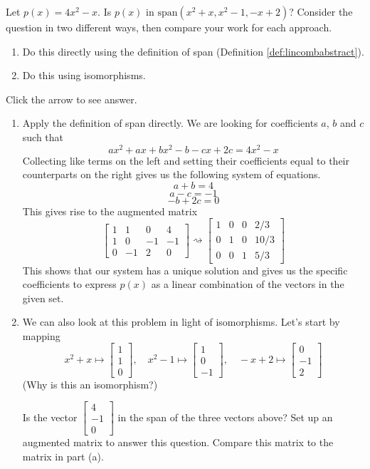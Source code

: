 \documentclass{ximera}
\begin{document}
\begin{problem}\label{prb:10.24} Let $p(x) = 4x^2-x$. Is $p(x)$ in
 $\mbox{span} \left( x^2+x, x^2-1, -x + 2 \right)$?  Consider the question in two different ways, then compare your work for each approach.
 \begin{enumerate}
     \item Do this directly using the definition of span (Definition \ref{def:lincombabstract}).
     \item Do this using isomorphisms.
 \end{enumerate}

Click the arrow to see answer.
\begin{expandable}
    \begin{enumerate}
        \item Apply the definition of span directly.  We are looking for coefficients $a$, $b$ and $c$ such that 
        $$ax^2+ax+bx^2-b-cx+2c=4x^2-x$$
        Collecting like terms on the left and setting their coefficients equal to their counterparts on the right gives us the following system of equations.
        $$a+b=4$$
        $$a-c=-1$$
        $$-b+2c=0$$
        This gives rise to the augmented matrix
        $$\left[
\begin{array}{rrr|r}
1 & 1 & 0 & 4 \\
1 & 0 & -1 & -1\\
0 & -1 & 2 & 0
\end{array}
\right]\rightsquigarrow \left[
\begin{array}{rrr|r}
1 & 0 & 0 & 2/3 \\
0 & 1 & 0 & 10/3\\
0 & 0 & 1 & 5/3
\end{array}
\right]$$
This shows that our system has a unique solution and gives us the specific coefficients to express $p(x)$ as a linear combination of the vectors in the given set.
\item We can also look at this problem in light of isomorphisms.  Let's start by mapping $$x^2+x\mapsto\begin{bmatrix}1\\1\\0\end{bmatrix},\quad x^2-1\mapsto\begin{bmatrix}1\\0\\-1\end{bmatrix}, \quad -x+2\mapsto\begin{bmatrix}0\\-1\\2\end{bmatrix}$$
(Why is this an isomorphism?)

Is the vector $\begin{bmatrix}4\\-1\\0\end{bmatrix}$ in the span of the three vectors above?  Set up an augmented matrix to answer this question.  Compare this matrix to the matrix in part (a).
    \end{enumerate}
\end{expandable}
\end{problem}
\end{document}
